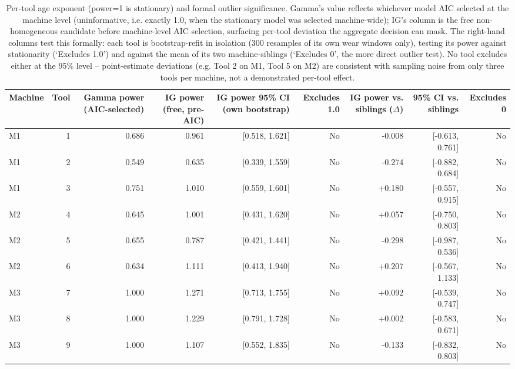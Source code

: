 \begin{table}[t]
\centering
\caption{Per-tool age exponent (power=1 is stationary) and formal outlier significance. Gamma's value reflects whichever model AIC selected at the machine level (uninformative, i.e. exactly 1.0, when the stationary model was selected machine-wide); IG's column is the free non-homogeneous candidate before machine-level AIC selection, surfacing per-tool deviation the aggregate decision can mask. The right-hand columns test this formally: each tool is bootstrap-refit in isolation (300 resamples of its own wear windows only), testing its power against stationarity (`Excludes 1.0') and against the mean of its two machine-siblings (`Excludes 0', the more direct outlier test). No tool excludes either at the 95\% level -- point-estimate deviations (e.g. Tool 2 on M1, Tool 5 on M2) are consistent with sampling noise from only three tools per machine, not a demonstrated per-tool effect.}
\label{tab:per-tool-heterogeneity}
\begin{tabular}{lrrrrrrrr}
\toprule
Machine & Tool & Gamma power (AIC-selected) & IG power (free, pre-AIC) & IG power 95\% CI (own bootstrap) & Excludes 1.0 & IG power vs. siblings ($\Delta$) & 95\% CI vs. siblings & Excludes 0 \\
\midrule
M1 & 1 & 0.686 & 0.961 & [0.518, 1.621] & No & -0.008 & [-0.613, 0.761] & No \\
M1 & 2 & 0.549 & 0.635 & [0.339, 1.559] & No & -0.274 & [-0.882, 0.684] & No \\
M1 & 3 & 0.751 & 1.010 & [0.559, 1.601] & No & +0.180 & [-0.557, 0.915] & No \\
M2 & 4 & 0.645 & 1.001 & [0.431, 1.620] & No & +0.057 & [-0.750, 0.803] & No \\
M2 & 5 & 0.655 & 0.787 & [0.421, 1.441] & No & -0.298 & [-0.987, 0.536] & No \\
M2 & 6 & 0.634 & 1.111 & [0.413, 1.940] & No & +0.207 & [-0.567, 1.133] & No \\
M3 & 7 & 1.000 & 1.271 & [0.713, 1.755] & No & +0.092 & [-0.539, 0.747] & No \\
M3 & 8 & 1.000 & 1.229 & [0.791, 1.728] & No & +0.002 & [-0.583, 0.671] & No \\
M3 & 9 & 1.000 & 1.107 & [0.552, 1.835] & No & -0.133 & [-0.832, 0.803] & No \\
\bottomrule
\end{tabular}
\end{table}
